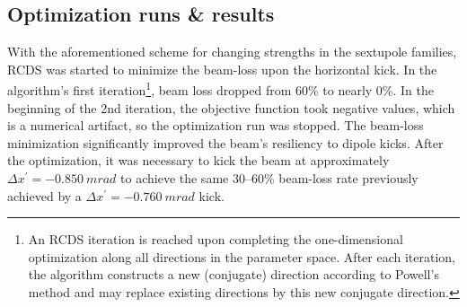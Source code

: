 \subsection{Optimization runs \& results}
With the aforementioned scheme for changing strengths in the sextupole families, RCDS was started to minimize the beam-loss upon the horizontal kick. In the algorithm's first iteration\footnote{An RCDS iteration is reached upon completing the one-dimensional optimization along all directions in the parameter space. After each iteration, the algorithm constructs a new (conjugate) direction according to Powell's method and may replace existing directions by this new conjugate direction.}, beam loss dropped from 60\% to nearly 0\%. In the beginning of the 2nd iteration, the objective function took negative values, which is a numerical artifact, so the optimization run was stopped. The beam-loss minimization significantly improved the beam's resiliency to dipole kicks. After the optimization, it was necessary to kick the beam at approximately $\Delta x^\prime=-0.850~\unit{m rad}$ to achieve the same  30--60\% beam-loss rate previously achieved by a $\Delta x^\prime=-0.760~\unit{m rad}$ kick.

